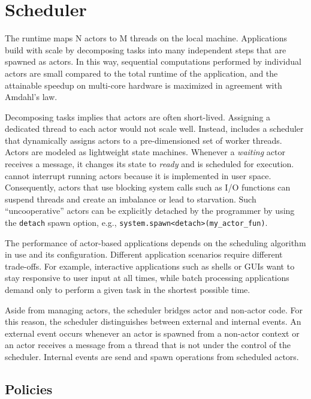 \section{Scheduler}
\label{scheduler}

The \lib runtime maps N actors to M threads on the local machine. Applications build with \lib scale by decomposing tasks into many independent steps that are spawned as actors. In this way, sequential computations performed by individual actors are small compared to the total runtime of the application, and the attainable speedup on multi-core hardware is maximized in agreement with Amdahl's law.

Decomposing tasks implies that actors are often short-lived. Assigning a dedicated thread to each actor would not scale well. Instead, \lib includes a scheduler that dynamically assigns actors to a pre-dimensioned set of worker threads. Actors are modeled as lightweight state machines. Whenever a \emph{waiting} actor receives a message, it changes its state to \emph{ready} and is scheduled for execution. \lib cannot interrupt running actors because it is implemented in user space. Consequently, actors that use blocking system calls such as I/O functions can suspend threads and create an imbalance or lead to starvation. Such ``uncooperative'' actors can be explicitly detached by the programmer by using the \lstinline^detach^ spawn option, e.g., \lstinline^system.spawn<detach>(my_actor_fun)^.

The performance of actor-based applications depends on the scheduling algorithm in use and its configuration. Different application scenarios require different trade-offs. For example, interactive applications such as shells or GUIs want to stay responsive to user input at all times, while batch processing applications demand only to perform a given task in the shortest possible time.

Aside from managing actors, the scheduler bridges actor and non-actor code. For this reason, the scheduler distinguishes between external and internal events. An external event occurs whenever an actor is spawned from a non-actor context or an actor receives a message from a thread that is not under the control of the scheduler. Internal events are send and spawn operations from scheduled actors.

\subsection{Policies}
\label{scheduler-policy}

